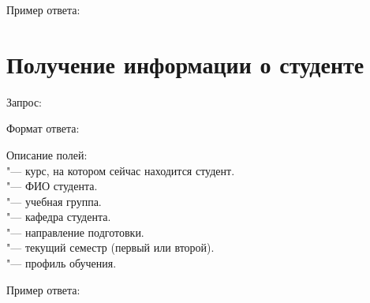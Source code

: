 Пример ответа:
\begin{listing}[H]
\end{listing}
\vspace{-0.75cm}

\section{Получение информации о студенте}
\label{sec:student}

Запрос: 

Формат ответа:
\begin{listing}[H]
\end{listing}
\vspace{-0.75cm}

Описание полей:\\
 "--- курс, на котором сейчас находится студент.\\
 "--- ФИО студента.\\
 "--- учебная группа.\\
 "--- кафедра студента.\\
 "--- направление подготовки.\\
 "--- текущий семестр (первый или второй).\\
 "--- профиль обучения.

Пример ответа:
\begin{listing}[H]
\end{listing}
\vspace{-0.75cm}
